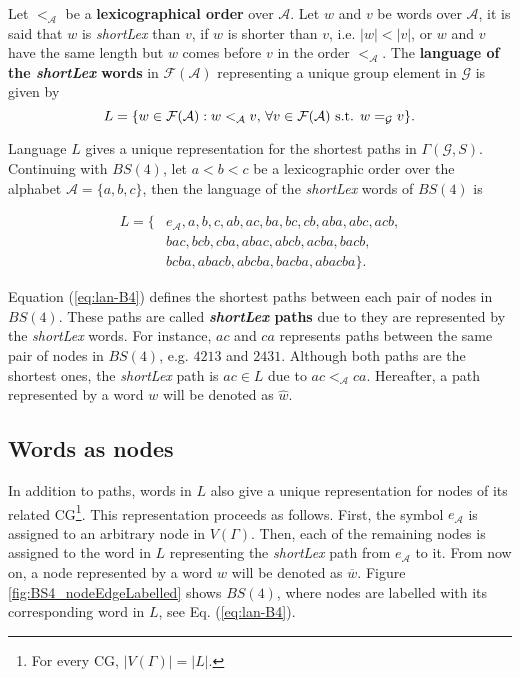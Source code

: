 \begin{definition}
\label{def:shortlexL}
Let $<_\mathcal{A}$ be a \textbf{lexicographical order} over $\mathcal{A}$. Let $w$ and $v$ be words over $\mathcal{A}$, it is said that $w$ is \textit{shortLex} than $v$, if $w$ is shorter than $v$, i.e. $|w|<|v|$, or $w$ and $v$ have the same length but $w$ comes before $v$ in the order $<_\mathcal{A}$.
 The \textbf{language of the \textit{shortLex} words} in $\mathcal{F}(\mathcal{A})$ representing a unique group element in $\mathcal{G}$ is given by 
 \begin{equation}
 \label{eq:lan}
 L=\{w\in \mathcal{F}(\mathcal{A}): w<_\mathcal{A} v\textnormal{, }\forall v\in \mathcal{F}(\mathcal{A}) \textnormal{ s.t. } w=_{\mathcal{G}}v\}. 
 \end{equation}
\end{definition}

Language $L$ gives a unique representation for 
the shortest paths  in $\Gamma(\mathcal{G},S)$. 
Continuing with $BS(4)$, let $a<b<c$ be a lexicographic order over the alphabet $\mathcal{A}=\{a,b,c\}$, then the language of the \textit{shortLex} words of $BS(4)$ is

\begin{equation}
     \begin{split}
    \label{eq:lan-B4}
    L =\{&e_\mathcal{A}, a, b, c, ab, ac, ba, bc, cb, aba, abc,acb,  \\
    &bac, bcb, cba,abac, abcb,acba, bacb,\\
    & bcba, abacb, abcba, bacba, abacba\}.
    \end{split}
\end{equation}

Equation (\ref{eq:lan-B4}) defines the shortest paths between each pair of nodes in $BS(4)$. These paths are called \textbf{\textit{shortLex} paths} due to they are represented by the \textit{shortLex} words. For instance, $ac$ and $ca$ represents paths between the same pair of nodes in $BS(4)$, e.g. $4213$ and $2431$. Although both paths are the shortest ones, the \textit{shortLex} path is $ac\in L$ due to $ac<_\mathcal{A} ca$. Hereafter, a path represented by a word $w$ will be denoted as $\widehat{w}$.

\subsection{Words as nodes}

In addition to paths, words in $L$ also give a unique representation for nodes of its related CG\footnote{For every CG, $|V(\Gamma)|=|L|$.}. This representation proceeds as follows. First, the symbol $e_\mathcal{A}$ is assigned to an arbitrary node in $V(\Gamma)$. Then, each of the remaining nodes is assigned to the word in $L$ representing the \textit{shortLex} path from $e_\mathcal{A}$ to it. From now on, a node represented by a word $w$ will be denoted as $\overline{w}$. Figure \ref{fig:BS4_nodeEdgeLabelled} shows $BS(4)$, where nodes are labelled with its corresponding word in $L$, see Eq. (\ref{eq:lan-B4}).

